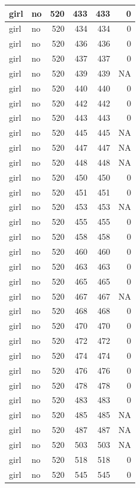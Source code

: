 \documentclass[man]{apa6}
\begin{document}
\begin{tabular}{l|l|r|r|r|r}
\hline
girl & no & 520 & 433 & 433 & 0\\
\hline
girl & no & 520 & 434 & 434 & 0\\
\hline
girl & no & 520 & 436 & 436 & 0\\
\hline
girl & no & 520 & 437 & 437 & 0\\
\hline
girl & no & 520 & 439 & 439 & NA\\
\hline
girl & no & 520 & 440 & 440 & 0\\
\hline
girl & no & 520 & 442 & 442 & 0\\
\hline
girl & no & 520 & 443 & 443 & 0\\
\hline
girl & no & 520 & 445 & 445 & NA\\
\hline
girl & no & 520 & 447 & 447 & NA\\
\hline
girl & no & 520 & 448 & 448 & NA\\
\hline
girl & no & 520 & 450 & 450 & 0\\
\hline
girl & no & 520 & 451 & 451 & 0\\
\hline
girl & no & 520 & 453 & 453 & NA\\
\hline
girl & no & 520 & 455 & 455 & 0\\
\hline
girl & no & 520 & 458 & 458 & 0\\
\hline
girl & no & 520 & 460 & 460 & 0\\
\hline
girl & no & 520 & 463 & 463 & 0\\
\hline
girl & no & 520 & 465 & 465 & 0\\
\hline
girl & no & 520 & 467 & 467 & NA\\
\hline
girl & no & 520 & 468 & 468 & 0\\
\hline
girl & no & 520 & 470 & 470 & 0\\
\hline
girl & no & 520 & 472 & 472 & 0\\
\hline
girl & no & 520 & 474 & 474 & 0\\
\hline
girl & no & 520 & 476 & 476 & 0\\
\hline
girl & no & 520 & 478 & 478 & 0\\
\hline
girl & no & 520 & 483 & 483 & 0\\
\hline
girl & no & 520 & 485 & 485 & NA\\
\hline
girl & no & 520 & 487 & 487 & NA\\
\hline
girl & no & 520 & 503 & 503 & NA\\
\hline
girl & no & 520 & 518 & 518 & 0\\
\hline
girl & no & 520 & 545 & 545 & 0\\

\end{tabular}
\end{document}
